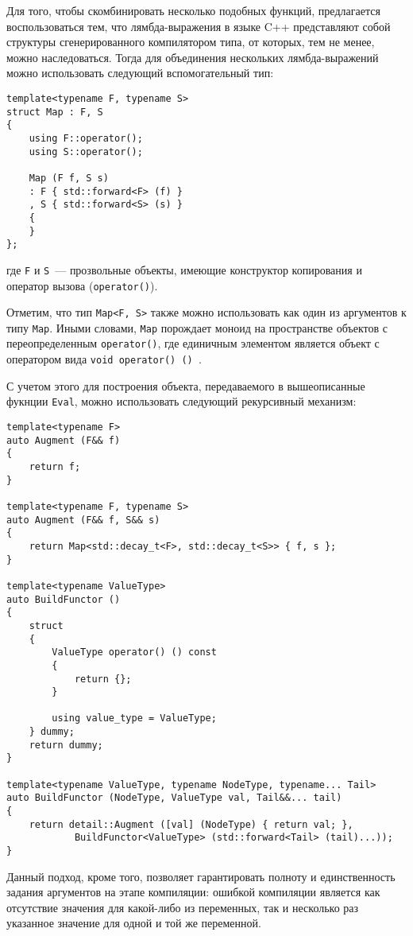 \documentclass[11pt,a4paper]{article}
\begin{document}
Для того, чтобы скомбинировать несколько подобных функций, предлагается воспользоваться
тем, что лямбда-выражения в языке C++ представляют собой структуры сгенерированного
компилятором типа, от которых, тем не менее, можно наследоваться. Тогда для объединения
нескольких лямбда-выражений можно использовать следующий вспомогательный тип:
\begin{lstlisting}
template<typename F, typename S>
struct Map : F, S
{
	using F::operator();
	using S::operator();

	Map (F f, S s)
	: F { std::forward<F> (f) }
	, S { std::forward<S> (s) }
	{
	}
};
\end{lstlisting}
где \texttt{F} и \texttt{S}~--- прозвольные объекты, имеющие конструктор копирования и
оператор вызова (\texttt{operator()}).

Отметим, что тип \texttt{Map<F, S>} также можно использовать как один из аргументов к
типу \texttt{Map}. Иными словами, \texttt{Map} порождает моноид на пространстве объектов
с переопределенным \texttt{operator()}, где единичным элементом является объект с
оператором вида \texttt{void operator() () {}}.

С учетом этого для построения объекта, передаваемого в вышеописанные фукнции
\texttt{Eval}, можно использовать следующий рекурсивный механизм:

\begin{lstlisting}
template<typename F>
auto Augment (F&& f)
{
	return f;
}

template<typename F, typename S>
auto Augment (F&& f, S&& s)
{
	return Map<std::decay_t<F>, std::decay_t<S>> { f, s };
}

template<typename ValueType>
auto BuildFunctor ()
{
	struct
	{
		ValueType operator() () const
		{
			return {};
		}

		using value_type = ValueType;
	} dummy;
	return dummy;
}

template<typename ValueType, typename NodeType, typename... Tail>
auto BuildFunctor (NodeType, ValueType val, Tail&&... tail)
{
	return detail::Augment ([val] (NodeType) { return val; },
			BuildFunctor<ValueType> (std::forward<Tail> (tail)...));
}
\end{lstlisting}

Данный подход, кроме того, позволяет гарантировать полноту и единственность задания
аргументов на этапе компиляции: ошибкой компиляции является как отсутствие значения
для какой-либо из переменных, так и несколько раз указанное значение для одной и той
же переменной.
\end{document}
